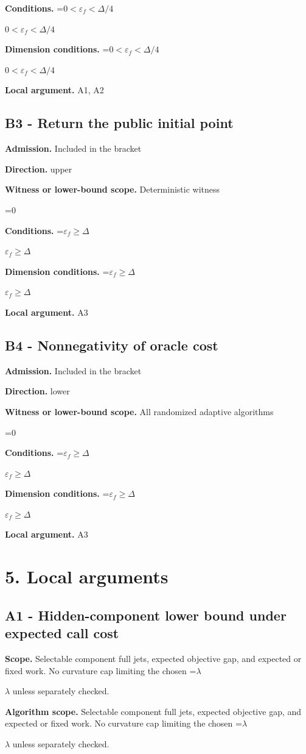 \documentclass[10pt,a4paper]{article}
\newcommand{\AtlasMath}[1]{\par\begingroup\centering\setbox0=\hbox{$\displaystyle #1$}\ifdim\wd0>1.4\linewidth\typeout{ATLAS WIDE FORMULA: \the\wd0}\fi\ifdim\wd0>\linewidth\resizebox{\linewidth}{!}{\box0}\else\box0\fi\par\endgroup}
\newcommand{\AtlasInlineMath}[1]{\begingroup\setbox0=\hbox{$#1$}\ifdim\wd0>.4\linewidth\endgroup\AtlasMath{#1}\else\endgroup$#1$\fi}
\begin{document}
\textbf{Conditions.} \AtlasInlineMath{0<\varepsilon_f<\Delta/4}

\textbf{Dimension conditions.} \AtlasInlineMath{0<\varepsilon_f<\Delta/4}

\textbf{Local argument.} A1, A2

\subsection{B3 - Return the public initial point}
\textbf{Admission.} Included in the bracket

\textbf{Direction.} upper

\textbf{Witness or lower-bound scope.} Deterministic witness

\AtlasMath{0}
\textbf{Conditions.} \AtlasInlineMath{\varepsilon_f\ge\Delta}

\textbf{Dimension conditions.} \AtlasInlineMath{\varepsilon_f\ge\Delta}

\textbf{Local argument.} A3

\subsection{B4 - Nonnegativity of oracle cost}
\textbf{Admission.} Included in the bracket

\textbf{Direction.} lower

\textbf{Witness or lower-bound scope.} All randomized adaptive algorithms

\AtlasMath{0}
\textbf{Conditions.} \AtlasInlineMath{\varepsilon_f\ge\Delta}

\textbf{Dimension conditions.} \AtlasInlineMath{\varepsilon_f\ge\Delta}

\textbf{Local argument.} A3

\section{5. Local arguments}
\subsection{A1 - Hidden-component lower bound under expected call cost}
\textbf{Scope.} Selectable component full jets, expected objective gap, and expected or fixed work. No curvature cap limiting the chosen \AtlasInlineMath{\lambda} unless separately checked.

\textbf{Algorithm scope.} Selectable component full jets, expected objective gap, and expected or fixed work. No curvature cap limiting the chosen \AtlasInlineMath{\lambda} unless separately checked.
\end{document}

